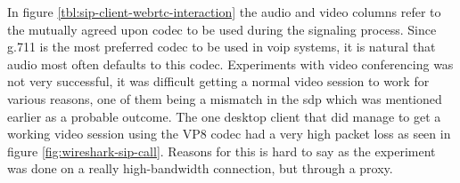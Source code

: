 \begin{table}[h]
\caption{SIP desktop client interaction with web client using proxy and RTCWeb}
\label{tbl:sip-client-webrtc-interaction}
\end{table}

In figure \ref{tbl:sip-client-webrtc-interaction} the audio and video columns refer to the mutually agreed upon codec to be used during the signaling process. Since g.711 is the most preferred codec to be used in \gls{voip} systems, it is natural that audio most often defaults to this codec. Experiments with video conferencing was not very successful, it was difficult getting a normal video session to work for various reasons, one of them being a mismatch in the \gls{sdp} which was mentioned earlier as a probable outcome. The one desktop client that did manage to get a working video session using the VP8 codec had a very high packet loss as seen in figure \ref{fig:wireshark-sip-call}. Reasons for this is hard to say as the experiment was done on a really high-bandwidth connection, but through a proxy.

